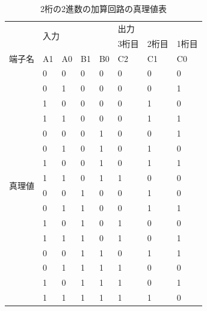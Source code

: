\documentclass[a4paper, 11pt, uplatex]{jsarticle}
\begin{document}
\begin{table}[H]
\begin{center}
\caption{2桁の2進数の加算回路の真理値表}
\label{加算回路真理値表}
\begin{tabular}{|l|l|l|l|l|l|l|l|}
\hline
                      & \multicolumn{4}{l|}{\multirow{2}{*}{入力}} & \multicolumn{3}{l|}{出力} \\ \cline{6-8}
                      & \multicolumn{4}{l|}{}                    & 3桁目    & 2桁目    & 1桁目   \\ \hline
端子名                   & A1       & A0       & B1       & B0      & C2     & C1     & C0    \\ \hline \hline
\multirow{16}{*}{真理値} & 0        & 0        & 0        & 0       & 0      & 0      & 0     \\
                      & 0        & 1        & 0        & 0       & 0      & 0      & 1     \\
                      & 1        & 0        & 0        & 0       & 0      & 1      & 0     \\
                      & 1        & 1        & 0        & 0       & 0      & 1      & 1     \\
                      & 0        & 0        & 0        & 1       & 0      & 0      & 1     \\
                      & 0        & 1        & 0        & 1       & 0      & 1      & 0     \\
                      & 1        & 0        & 0        & 1       & 0      & 1      & 1     \\
                      & 1        & 1        & 0        & 1       & 1      & 0      & 0     \\
                      & 0        & 0        & 1        & 0       & 0      & 1      & 0     \\
                      & 0        & 1        & 1        & 0       & 0      & 1      & 1     \\
                      & 1        & 0        & 1        & 0       & 1      & 0      & 0     \\
                      & 1        & 1        & 1        & 0       & 1      & 0      & 1     \\
                      & 0        & 0        & 1        & 1       & 0      & 1      & 1     \\
                      & 0        & 1        & 1        & 1       & 1      & 0      & 0     \\
                      & 1        & 0        & 1        & 1       & 1      & 0      & 1     \\
                      & 1        & 1        & 1        & 1       & 1      & 1      & 0     \\ \hline
\end{tabular}
\end{center}
\end{table}
\end{document}
